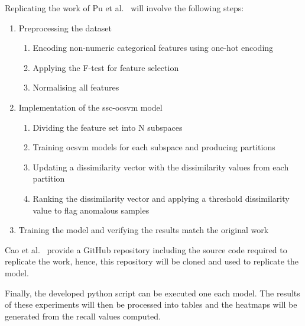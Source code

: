 Replicating the work of Pu et al.~\cite{Pu} will involve the following steps:
\begin{enumerate}
      \item Preprocessing the dataset
            \begin{enumerate}
                  \item Encoding non-numeric categorical features using one-hot encoding
                  \item Applying the F-test for feature selection
                  \item Normalising all features
            \end{enumerate}
      \item Implementation of the \gls{ssc}-\gls{ocsvm} model
      \begin{enumerate}
            \item Dividing the feature set into N subspaces
            \item Training \gls{ocsvm} models for each subspace and producing partitions
            \item Updating a dissimilarity vector with the dissimilarity values from each partition
            \item Ranking the dissimilarity vector and applying a threshold dissimilarity value to flag anomalous samples
      \end{enumerate}
      \item Training the model and verifying the results match the original work
\end{enumerate}

Cao et al.~\cite{Cao} provide a GitHub repository including the
source code required to replicate the work, hence, this repository will be
cloned and used to replicate the model.

Finally, the developed python script can be executed one each model. The
results of these experiments will then be processed into tables and the
heatmaps will be generated from the recall values computed.
